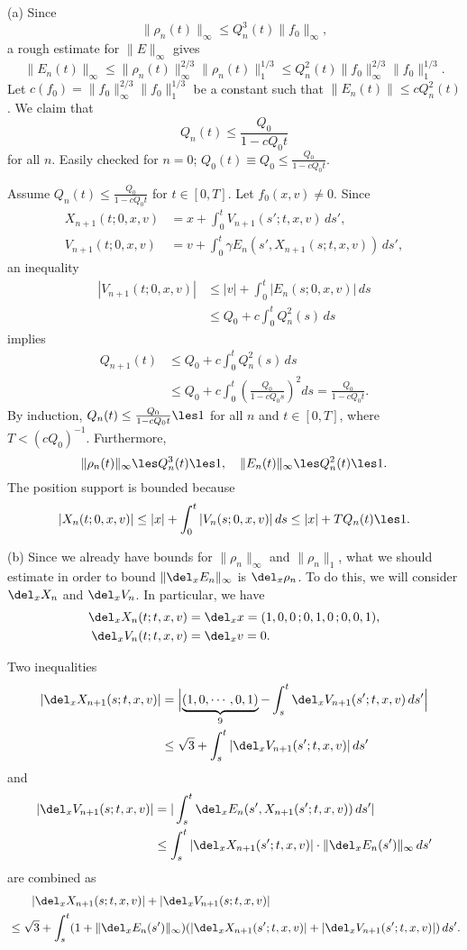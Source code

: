 \documentclass[11pt]{amsart}
\begin{document}
\begin{pf}
(a)
Since
\[\|\rho_n(t)\|_\infty\le Q_n^3(t)\|f_0\|_\infty,\]
a rough estimate for $\|E\|_\infty$ gives
\[\|E_n(t)\|_\infty\le\|\rho_n(t)\|_\infty^{2/3}\|\rho_n(t)\|_1^{1/3}\le Q_n^2(t)\|f_0\|_\infty^{2/3}\|f_0\|_1^{1/3}.\]
Let $c(f_0)=\|f_0\|_\infty^{2/3}\|f_0\|_1^{1/3}$ be a constant such that $\|E_n(t)\|\le cQ_n^2(t)$.
We claim that
\[Q_n(t)\le\frac{Q_0}{1-cQ_0t}\]
for all $n$.
Easily checked for $n=0$; $Q_0(t)\equiv Q_0\le\frac{Q_0}{1-cQ_0t}$.

Assume $Q_n(t)\le\frac{Q_0}{1-cQ_0t}$ for $t\in[0,T]$.
Let $f_0(x,v)\ne0$.
Since
\begin{align*}
X_{n+1}(t;0,x,v)&=x+\int_0^tV_{n+1}(s';t,x,v)\,ds',\\
V_{n+1}(t;0,x,v)&=v+\int_0^t\gamma E_n(s',X_{n+1}(s;t,x,v))\,ds',
\end{align*}
an inequality
\begin{align*}
|V_{n+1}(t;0,x,v)|
&\le|v|+\int_0^t|E_n(s;0,x,v)|\,ds\\
&\le Q_0+c\int_0^tQ_n^2(s)\,ds
\end{align*}
implies
\begin{align*}
Q_{n+1}(t)
&\le Q_0+c\int_0^tQ_n^2(s)\,ds\\
&\le Q_0+c\int_0^t\left(\frac{Q_0}{1-cQ_0s}\right)^2ds
=\frac{Q_0}{1-cQ_0t}.
\end{align*}
By induction, $Q_n(t)\le\frac{Q_0}{1-cQ_0t}\les1$ for all $n$ and $t\in[0,T]$, where $T<(cQ_0)^{-1}$.
Furthermore,
\[\|\rho_n(t)\|_\infty\les Q_n^3(t)\les1,\quad\|E_n(t)\|_\infty\les Q_n^2(t)\les1.\]
The position support is bounded because
\[|X_n(t;0,x,v)|\le|x|+\int_0^t|V_n(s;0,x,v)|\,ds\le|x|+TQ_n(t)\les1.\]

(b)
Since we already have bounds for $\|\rho_n\|_\infty$ and $\|\rho_n\|_1$, what we should estimate in order to bound $\|\del_xE_n\|_\infty$ is $\del_x\rho_n$.
To do this, we will consider $\del_xX_n$ and $\del_xV_n$.
In particular, we have
\begin{align*}
\del_xX_n(t;t,x,v)&=\del_xx=(1,0,0\,;0,1,0\,;0,0,1),\\
\del_xV_n(t;t,x,v)&=\del_xv=0.
\end{align*}

Two inequalities
\begin{align*}
|\del_xX_{n+1}(s;t,x,v)|
&=\Bigl|\underbrace{(1,0,\cdots,0,1)}_{9}-\int_s^t\del_xV_{n+1}(s';t,x,v)\,ds'\Bigr|\\
&\le\sqrt3+\int_s^t|\del_xV_{n+1}(s';t,x,v)|\,ds'
\end{align*}
and
\begin{align*}
|\del_xV_{n+1}(s;t,x,v)|
&=|\int_s^t\del_xE_n(s',X_{n+1}(s';t,x,v))\,ds'|\\
&\le\int_s^t|\del_xX_{n+1}(s';t,x,v)|\cdot\|\del_xE_n(s')\|_\infty\,ds'
\end{align*}
are combined as
\begin{align*}
&\qquad|\del_xX_{n+1}(s;t,x,v)|+|\del_xV_{n+1}(s;t,x,v)|\\
&\le\sqrt3+\int_s^t(1+\|\del_xE_n(s')\|_\infty)(|\del_xX_{n+1}(s';t,x,v)|+|\del_xV_{n+1}(s';t,x,v)|)\,ds'.
\end{align*}


\end{pf}
\end{document}
